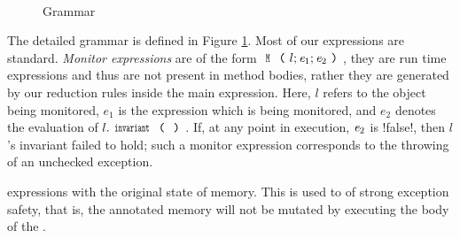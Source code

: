 \begin{figure}
\begin{grammatica}
		
		\\
		\\
		\\
		\\
		\\
		\\
	\end{grammatica}
	\caption{Grammar}\label{f:grammar}
\end{figure}


The detailed grammar is defined in Figure \ref{f:grammar}. 
Most of our expressions are standard.
\emph{Monitor expressions}
 are of the form $\Kw{M}\oR l;\e_1;\e_2\cR$, they 
are run time expressions and thus are not present in method bodies, rather they are generated by our reduction rules inside the main expression. Here, $l$ refers to the object being monitored, $e_1$ is the expression which is being monitored, and $e_2$ denotes the evaluation of $l.\invariant$. If, at any point in execution, ${\mathit{e}}_2$ is \Q!false!, then $l$'s invariant failed to hold; such a monitor expression corresponds to the throwing of an unchecked exception.

 \Q@try@ expressions with
the original state of memory. This is used to  of strong exception safety, that is, the annotated memory will not be mutated by executing the body of the \Q@try@.


